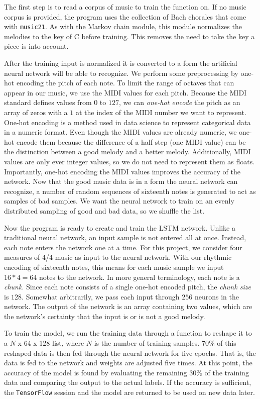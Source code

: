 The first step is to read a corpus of music to train the function on.
If no music corpus is provided, the program uses the collection of Bach chorales that come with \texttt{music21}.
As with the Markov chain module, this module normalizes the melodies to the key of C before training.
This removes the need to take the key a piece is into account.

After the training input is normalized it is converted to a form the artificial neural network will be able to recognize.
We perform some preprocessing by one-hot encoding the pitch of each note.
To limit the range of octaves that can appear in our music, we use the MIDI values for each pitch.
Because the MIDI standard defines values from $0$ to $127$, we can \textit{one-hot encode} the pitch as an array of zeros with a $1$ at the index of the MIDI number we want to represent.
One-hot encoding is a method used in data science to represent categorical data in a numeric format.
Even though the MIDI values are already numeric, we one-hot encode them because the difference of a half step (one MIDI value) can be the distinction between a good melody and a better melody.
Additionally, MIDI values are only ever integer values, so we do not need to represent them as floats.
Importantly, one-hot encoding the MIDI values improves the accuracy of the network.
Now that the good music data is in a form the neural network can recognize, a number of random sequences of sixteenth notes is generated to act as samples of bad samples.
We want the neural network to train on an evenly distributed sampling of good and bad data, so we shuffle the list.

Now the program is ready to create and train the LSTM network.
Unlike a traditional neural network, an input sample is not entered all at once.
Instead, each note enters the network one at a time.
For this project, we consider four measures of 4/4 music as input to the neural network.
With our rhythmic encoding of sixteenth notes, this means for each music sample we input $16 * 4 = 64$ notes to the network.
In more general terminology, each note is a \textit{chunk}.
Since each note consists of a single one-hot encoded pitch, the \textit{chunk size} is $128$.
Somewhat arbitrarily, we pass each input through $256$ neurons in the network.
The output of the network is an array containing two values, which are the network's certainty that the input is or is not a good melody.

To train the model, we run the training data through a function to reshape it to a $N$ x 64 x 128 list, where $N$ is the number of training samples.
$70\%$ of this reshaped data is then fed through the neural network for five epochs.
That is, the data is fed to the network and weights are adjusted five times.
At this point, the accuracy of the model is found by evaluating the remaining $30\%$ of the training data and comparing the output to the actual labels.
If the accuracy is sufficient, the \texttt{TensorFlow} session and the model are returned to be used on new data later.


